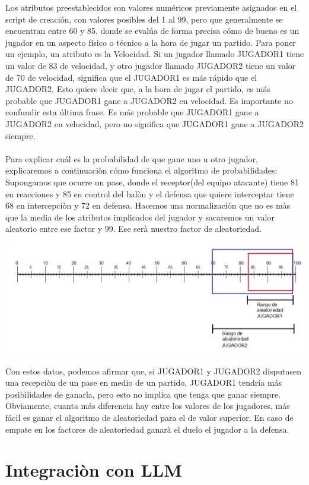 \documentclass{article}
\begin{document}
Los atributos preestablecidos son valores numéricos previamente asignados en el
script de creación, con valores posibles del 1 al 99, pero que generalmente se
encuentran entre 60 y 85, donde se evalúa de forma precisa cómo de bueno es un
jugador en un aspecto físico o técnico a la hora de jugar un partido.
Para poner un ejemplo, un atributo es la Velocidad. Si un jugador llamado JUGADOR1
tiene un valor de 83 de velocidad, y otro jugador llamado JUGADOR2 tiene un valor de
70 de velocidad, significa que el JUGADOR1 es más rápido que el JUGADOR2. Esto quiere decir que, a la hora de jugar el partido, es más probable que JUGADOR1 gane a
JUGADOR2 en velocidad.
Es importante no confundir esta última frase. Es más probable que JUGADOR1 gane a
JUGADOR2 en velocidad, pero no significa que JUGADOR1 gane a JUGADOR2 siempre.\\\\
Para explicar cuál es la probabilidad de que gane uno u otro jugador,
explicaremos a continuaciòn cómo funciona el algoritmo de probabilidades:\\

Supongamos que ocurre un pase, donde el receptor(del equipo atacante) tiene 81 en reacciones y 85 en control del balòn y el defensa que quiere interceptar tiene 68 en intercepciòn y 72 en defensa. Hacemos una normalizaciòn que no es màs que la media de los atributos implicados del jugador y sacaremos un valor aleatorio entre ese factor y 99. Ese serà nuestro factor de aleatoriedad.
    
    
\includegraphics*[width=1\textwidth]{rango.jpg}
\bigskip

    Con estos datos, podemos afirmar que, si JUGADOR1 y JUGADOR2 disputasen una
recepciòn de un pase en medio de un partido, JUGADOR1 tendría más posibilidades de
ganarla, pero esto no implica que tenga que ganar siempre.
Obviamente, cuanta más diferencia hay entre los valores de los jugadores, más fácil es
ganar el algoritmo de aleatoriedad para el de valor superior. En caso de empate en los factores de aleatoriedad ganarà el duelo el jugador a la defensa.

\section{Integraciòn con LLM}
    
\end{document}

